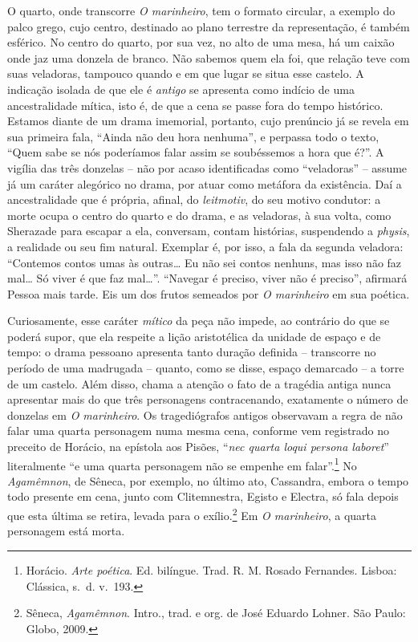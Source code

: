 O quarto, onde transcorre \textit{O marinheiro}, tem o formato circular, a exemplo do palco grego,
cujo centro, destinado ao plano terrestre da representação,
é também esférico. No centro do quarto, por sua vez, no alto
de uma mesa, há um caixão onde jaz uma donzela de branco.
Não sabemos quem ela foi, que relação teve
com suas veladoras, tampouco quando e em que lugar se situa esse
castelo. A indicação isolada de que ele
é \textit{antigo} se apresenta
como indício de uma ancestralidade mítica, isto é, de que a cena se
passe fora do tempo histórico. Estamos diante de um 
drama imemorial,
portanto, cujo prenúncio já se revela em sua primeira 
fala, “Ainda não
deu hora nenhuma”, e perpassa todo o texto, “Quem sabe se nós
poderíamos falar assim se soubéssemos a hora que é?”.
A vigília das três
donzelas -- não por acaso identificadas como “veladoras” --
assume já um caráter alegórico no drama, por atuar como 
metáfora da existência. Daí
a ancestralidade que é própria, afinal, do
\textit{leitmotiv}, do seu motivo condutor:
a morte ocupa o centro do quarto e do drama, e as
veladoras, à sua volta, como Sherazade para escapar a ela,
conversam,
contam histórias, suspendendo a \textit{physis},
a realidade ou seu fim natural. 
Exemplar é, por isso, a fala da segunda veladora: “Contemos
contos umas às outras\ldots{} Eu não sei contos nenhuns, 
mas isso não faz mal\ldots{} Só viver é que faz mal\ldots{}”. 
``Navegar é preciso, viver não é
preciso'', afirmará Pessoa mais tarde. Eis um dos 
frutos semeados por \textit{O marinheiro} em sua poética.

Curiosamente, esse caráter \textit{mítico} da peça não impede, ao
contrário do que se poderá supor, que ela respeite a lição 
aristotélica da unidade de espaço e de tempo: 
o drama pessoano apresenta tanto
duração definida -- transcorre no período de
uma madrugada -- quanto, como se disse, espaço
demarcado -- a torre de um castelo. Além disso,
chama a atenção o fato de a tragédia antiga 
nunca apresentar mais do
que três personagens contracenando, exatamente 
o número de donzelas em
\textit{O marinheiro}. Os tragediógrafos antigos 
observavam a regra de
não falar uma quarta personagem numa mesma cena, conforme vem
registrado no preceito de Horácio, na epístola aos Pisões,
``\textit{nec quarta loqui persona laboret}'' literalmente 
``e uma quarta personagem não se empenhe em
falar''.\footnote{ Horácio. \textit{Arte poética}. Ed.
bilíngue. Trad.  R. M. Rosado Fernandes. Lisboa: Clássica, s.~d.
v.~193.} No \textit{Agamêmnon},
de Sêneca, por exemplo, no último ato,
Cassandra, embora o tempo todo presente em cena, junto com
Clitemnestra, Egisto e Electra, só fala depois que esta última se
retira, levada para o exílio.\footnote{ Sêneca,
\textit{Agamêmnon}.
Intro., trad. e org. de José Eduardo Lohner.
São Paulo: Globo,
2009.} Em \textit{O marinheiro}, a quarta personagem está morta. 

